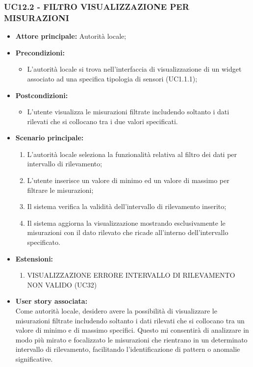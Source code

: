 \subsubsection{UC12.2 - FILTRO VISUALIZZAZIONE PER MISURAZIONI}
\begin{itemize}
    \item \textbf{Attore principale:} Autorità locale;
    \item \textbf{Precondizioni:}
        \begin{itemize}
            \item L'autorità locale si trova nell'interfaccia di visualizzazione di un widget associato ad una specifica tipologia di sensori (UC1.1.1);
        \end{itemize}
    \item \textbf{Postcondizioni:}
        \begin{itemize}
            \item L'utente visualizza le misurazioni filtrate includendo soltanto i dati rilevati che si collocano tra i due valori specificati.
        \end{itemize}
    \item \textbf{Scenario principale:}
        \begin{enumerate}
            \item L'autorità locale seleziona la funzionalità relativa al filtro dei dati per intervallo di rilevamento;
            \item L'utente inserisce un valore di minimo ed un valore di massimo per filtrare le misurazioni;
            \item Il sistema verifica la validità dell'intervallo di rilevamento inserito;
            \item Il sistema aggiorna la visualizzazione mostrando esclusivamente le misurazioni con il dato rilevato che ricade all'interno dell'intervallo specificato.
        \end{enumerate}
    \item \textbf{Estensioni:}
        \begin{enumerate}
            \item VISUALIZZAZIONE ERRORE INTERVALLO DI RILEVAMENTO NON VALIDO (UC32)
        \end{enumerate}
    \item \textbf{User story associata:} \\
        Come autorità locale, desidero avere la possibilità di visualizzare le misurazioni filtrate includendo soltanto i dati rilevati che si collocano tra un valore di minimo e di massimo specifici. Questo mi consentirà di analizzare in modo più mirato e focalizzato le misurazioni che rientrano in un determinato intervallo di rilevamento, facilitando l'identificazione di pattern o anomalie significative.
\end{itemize}
